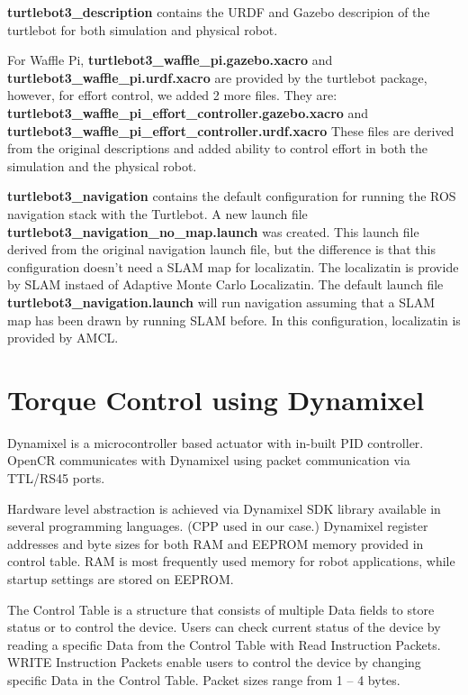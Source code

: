 \documentclass[12]{article}
\begin{document}
\textbf{turtlebot3\_description} contains the URDF and Gazebo descripion of the turtlebot for both simulation and physical robot. 

For Waffle Pi, \textbf{turtlebot3\_waffle\_pi.gazebo.xacro}
and \textbf{turtlebot3\_waffle\_pi.urdf.xacro}
are provided by the turtlebot package, however, for effort control, we added 2 more files. 
They are: \textbf{turtlebot3\_waffle\_pi\_effort\_controller.gazebo.xacro}
and \textbf{turtlebot3\_waffle\_pi\_effort\_controller.urdf.xacro}
These files are derived from the original descriptions and added ability to control effort in both the simulation and the physical robot. 

\textbf{turtlebot3\_navigation} contains the default configuration for running the ROS navigation stack with the Turtlebot.
A new launch file \textbf{turtlebot3\_navigation\_no\_map.launch} was created. This launch file derived from the original navigation launch file, but the difference is that this configuration doesn't need a SLAM map for localizatin. 
The localizatin is provide by SLAM instaed of Adaptive Monte Carlo Localizatin. The default launch file \textbf{turtlebot3\_navigation.launch} will run navigation assuming that a SLAM map has been drawn by running SLAM before. In this configuration, 
localizatin is provided by AMCL. 


\section{Torque Control using Dynamixel}
       
Dynamixel is a microcontroller based actuator with in-built PID controller. OpenCR communicates with Dynamixel using packet communication via TTL/RS45 ports. 

Hardware level abstraction is achieved via Dynamixel SDK library available in several programming languages. (CPP used in our case.)
Dynamixel register addresses and byte sizes for both RAM and EEPROM memory provided in control table. RAM is most frequently used memory for robot applications, while startup settings are stored on EEPROM.

The Control Table is a structure that consists of multiple Data fields to store status or to control the device. Users can check current status of the device by reading a specific Data from the Control Table with Read Instruction Packets. WRITE Instruction Packets enable users to control the device by changing specific Data in the Control Table. Packet sizes range from 1 – 4 bytes.
\end{document}
